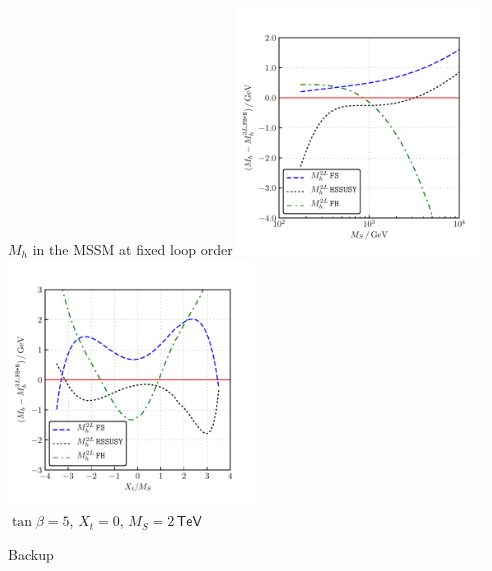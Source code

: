 \documentclass[hyperref={pdfpagelabels=false},ngerman]{beamer}
\newcommand{\eh}[1]{\,\mathsf{#1}}
\newcommand{\MS}{\ensuremath{M_S}}
\begin{document}
\begin{frame}{$M_h$ in the MSSM at fixed loop order}
  \includegraphics[width=0.49\textwidth]{plots/Mh3L/scan_Mh_MS_TB-5_Xt-0_diff}\hfill
  \includegraphics[width=0.49\textwidth]{plots/Mh3L/scan_Mh_Xt_TB-5_MS-2000_diff}\\
  $\tan\beta=5$, $X_t=0$, $\MS = 2\eh{TeV}$
\end{frame}


\begin{frame}[noframenumbering]
  \begin{center}
    \Huge Backup
  \end{center}
\end{frame}
\end{document}
